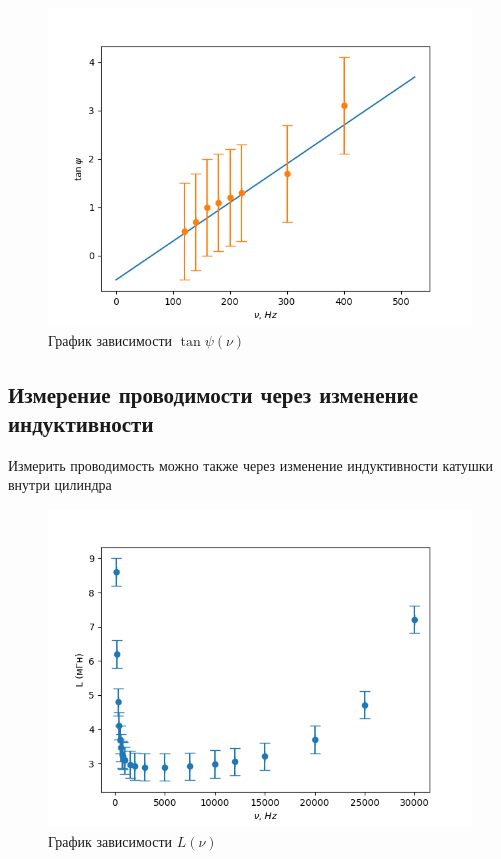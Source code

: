 \documentclass[a4paper]{article}
\begin{document}
\begin{figure}[h!]
    \centering
    \includegraphics[width=0.6\pdfpagewidth]{graph3.png}
    \caption{График зависимости $\tan{\psi}(\nu)$}
\end{figure}

\subsection{Измерение проводимости через изменение индуктивности}

Измерить проводимость можно также через изменение индуктивности катушки внутри цилиндра

\begin{figure}[h!]
    \centering
    \includegraphics[width=0.6\pdfpagewidth]{graph4.png}
    \caption{График зависимости $L(\nu)$}
\end{figure}
\end{document}
